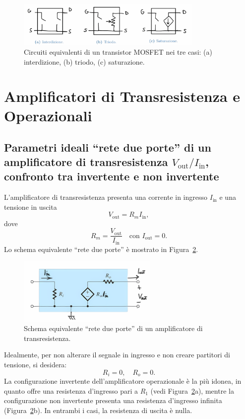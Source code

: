 \begin{figure}[H]
    \centering
    \includegraphics[width=0.8\textwidth]{images/1.1.3.1.png}
    \caption{Circuiti equivalenti di un transistor MOSFET nei tre casi: (a) interdizione, (b) triodo, (c) saturazione.}
    \label{fig:mos_grandi}
\end{figure}

\newpage
\section{Amplificatori di Transresistenza e Operazionali}

\subsection{Parametri ideali “rete due porte” di un amplificatore di transresistenza \(V_{\text{out}}/I_{\text{in}}\), confronto tra invertente e non invertente}

L'amplificatore di transresistenza presenta una corrente in ingresso \(I_{\text{in}}\) e una tensione in uscita
\[
V_{\text{out}} = R_m I_{\text{in}},
\]
dove
\[
R_m = \frac{V_{\text{out}}}{I_{\text{in}}} \quad \text{con } I_{\text{out}} = 0.
\]
Lo schema equivalente “rete due porte” è mostrato in Figura~\ref{fig:transresistenza}.\\[2mm]
\begin{figure}[H]
    \centering
    \includegraphics[width=0.6\textwidth]{images/1.2.1.1.png}
    \caption{Schema equivalente “rete due porte” di un amplificatore di transresistenza.}
    \label{fig:transresistenza}
\end{figure}

Idealmente, per non alterare il segnale in ingresso e non creare partitori di tensione, si desidera:
\[
R_i = 0, \quad R_o = 0.
\]
La configurazione invertente dell'amplificatore operazionale è la più idonea, in quanto offre una resistenza d’ingresso pari a \(R_1\) (vedi Figura~\ref{fig:transresistenza}a), mentre la configurazione non invertente presenta una resistenza d’ingresso infinita (Figura~\ref{fig:transresistenza}b). In entrambi i casi, la resistenza di uscita è nulla.
\newpage

